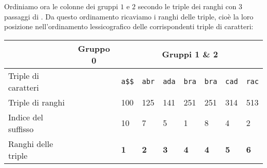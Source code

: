 \newpage

Ordiniamo ora le colonne dei gruppi \(1\) e \(2\) secondo le triple dei ranghi con
\(3\) passaggi di \radixsort. Da questo ordinamento ricaviamo i ranghi delle 
triple, cio\`e la loro posizione nell'ordinamento lessicografico delle
corrispondenti triple di caratteri:
\begin{table}[h]
  \begin{tabularx}{\linewidth}{l*{11}{X}}
                        & \multicolumn{4}{c}{Gruppo 0 \cellcolor{green} } 
                        & \multicolumn{7}{c}{Gruppi 1 \& 2\cellcolor{orange} } \\
    \hline
    Triple di caratteri & \multicolumn{4}{c}{\cellcolor{gray!25}}
                        & \texttt{a\$\$} & \texttt{abr} & \texttt{ada} & \texttt{bra}
                        & \texttt{bra} & \texttt{cad} & \texttt{rac} \\
    Triple di ranghi    & \multicolumn{4}{c}{\cellcolor{gray!25}}
                        & 100 & 125 & 141 & 251
                        & 251 & 314 & 513 \\
    Indice del suffisso & \multicolumn{4}{c}{\cellcolor{gray!25}}
                        & 10 & 7 & 5 & 1
                        & 8 & 4 & 2 \\
    Ranghi delle triple & \multicolumn{4}{c}{\cellcolor{gray!25}}
                        & \textbf{1} & \textbf{2} & \textbf{3} & \textbf{4}
                        & \textbf{4} & \textbf{5} & \textbf{6} \\
  \end{tabularx}
\end{table}

